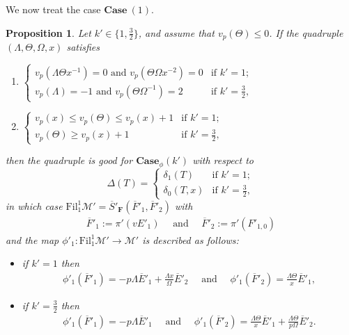 \documentclass[11pt]{amsart}
\theoremstyle{definition}
\numberwithin{equation}{subsection}
\theoremstyle{plain}
\theoremstyle{plain}
\theoremstyle{plain}
\theoremstyle{plain}
\theoremstyle{plain}
\theoremstyle{plain}
\theoremstyle{plain}
\theoremstyle{plain}
\newtheorem{prop}[equation]{Proposition}
\theoremstyle{plain}
\theoremstyle{plain}
\theoremstyle{plain}
\theoremstyle{plain}
\theoremstyle{definition}
\theoremstyle{definition}
\theoremstyle{definition}
\theoremstyle{remark}
\renewcommand{\(}{\textup{(}}
\renewcommand{\)}{\textup{)}}
\newcommand{\F}{\mathbf{F}}
\newcommand{\barS}{\overline{S}}
\newcommand{\cM}{\mathcal{M}}
\newcommand{\Fil}{\mathrm{Fil}}
\newcommand{\barE}{\overline{E}}
\newcommand{\barF}{\overline{F}}
\begin{document}
We now treat the case $\mathbf{Case}~(1)$.
\begin{prop}\label{prop: case phi 1, r=1}
Let $k'\in\{1,\frac{3}{2}\}$, and assume that $v_p(\Theta)\leq 0$. If the quadruple $(\Lambda,\Theta,\Omega,x)$ satisfies
\begin{enumerate}[leftmargin=*]
    \item $\begin{cases}
             v_p(\Lambda \Theta x^{-1})=0\mbox{ and } v_p(\Theta\Omega x^{-2})=0 & \mbox{if } k'=1; \\
             v_p(\Lambda)=-1\mbox{ and } v_p(\Theta\Omega^{-1})=2 & \mbox{if } k'=\frac{3}{2},
           \end{cases}$
    \item $\begin{cases}
             v_p(x)\leq v_p(\Theta)\leq v_p(x)+1 & \mbox{if } k'=1; \\
             v_p(\Theta)\geq v_p(x)+1 & \mbox{if } k'=\frac{3}{2},
           \end{cases}$
\end{enumerate}
then the quadruple is good for $\mathbf{Case}_\phi(k')$ with respect to
$$\Delta(T)=
        \begin{cases}
            \delta_1(T) & \mbox{if } k'=1; \\
            \delta_0(T,x) & \mbox{if } k'=\frac{3}{2},
        \end{cases}$$
in which case $\Fil^1_{1}\cM'=\barS'_\F(\barF'_1,\barF'_2)$ with
    \begin{align*}
    \barF'_1:=\pi'(vE'_1)\quad\mbox{ and }\quad\barF'_2:=\pi'(F'_{1,0})
    \end{align*}
    and the map $\phi'_1:\Fil^1_{1}\cM'\to\cM'$ is described as follows:
\begin{itemize}[leftmargin=*]
\item if $k'=1$ then
    \begin{align*}
    \phi'_1(\barF'_1)=-p\Lambda\barE'_1+\frac{\Lambda x}{\Omega}\barE'_2\quad\mbox{ and }\quad\phi'_1(\barF'_2)=\frac{\Lambda\Theta}{x}\barE'_1,
    \end{align*}
\item if $k'=\frac{3}{2}$ then
    \begin{align*}
    \phi'_1(\barF'_1)=-p\Lambda\barE'_1\quad\mbox{ and }\quad\phi'_1(\barF'_2)=\frac{\Lambda\Theta}{x}\barE'_1+\frac{\Lambda\Theta}{p\Omega}\barE'_2.
    \end{align*}
\end{itemize}
\end{prop}
\end{document}

